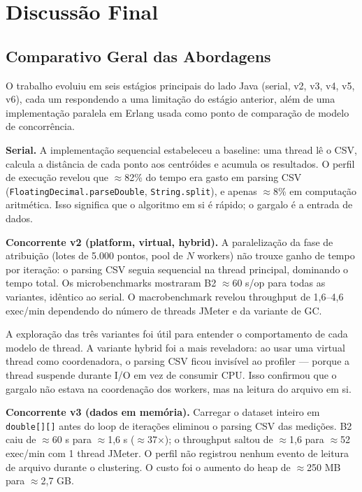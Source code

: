 \section{Discussão Final}

\subsection{Comparativo Geral das Abordagens}

O trabalho evoluiu em seis estágios principais do lado Java (serial, v2, v3, v4,
v5, v6), cada um respondendo a uma limitação do estágio anterior, além de uma
implementação paralela em Erlang usada como ponto de comparação de modelo de
concorrência.

\textbf{Serial.}
A implementação sequencial estabeleceu a baseline: uma thread lê o CSV, calcula a
distância de cada ponto aos centróides e acumula os resultados. O perfil de execução
revelou que $\approx$82\% do tempo era gasto em parsing CSV
(\texttt{FloatingDecimal.parseDouble}, \texttt{String.split}), e apenas $\approx$8\%
em computação aritmética. Isso significa que o algoritmo em si é rápido; o gargalo
é a entrada de dados.

\textbf{Concorrente v2 (platform, virtual, hybrid).}
A paralelização da fase de atribuição (lotes de 5.000 pontos, pool de $N$ workers)
não trouxe ganho de tempo por iteração: o parsing CSV seguia sequencial na thread
principal, dominando o tempo total. Os microbenchmarks mostraram B2
$\approx$60 s/op para todas as variantes, idêntico ao serial. O macrobenchmark
revelou throughput de 1,6--4,6 exec/min dependendo do número de threads JMeter
e da variante de GC.

A exploração das três variantes foi útil para entender o comportamento de cada
modelo de thread. A variante hybrid foi a mais reveladora: ao usar uma virtual thread
como coordenadora, o parsing CSV ficou invisível ao profiler --- porque a thread
suspende durante I/O em vez de consumir CPU. Isso confirmou que o gargalo não estava
na coordenação dos workers, mas na leitura do arquivo em si.

\textbf{Concorrente v3 (dados em memória).}
Carregar o dataset inteiro em \texttt{double[][]} antes do loop de iterações
eliminou o parsing CSV das medições. B2 caiu de $\approx$60 s para $\approx$1{,}6 s
($\approx$37$\times$); o throughput saltou de $\approx$1,6 para $\approx$52
exec/min com 1 thread JMeter. O perfil não registrou nenhum evento de leitura de
arquivo durante o clustering. O custo foi o aumento do heap de $\approx$250 MB
para $\approx$2{,}7 GB.

